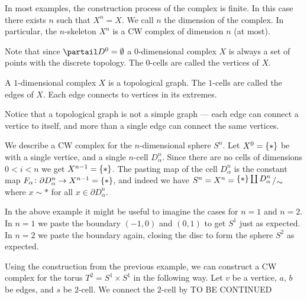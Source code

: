 \documentclass[11pt,a4paper]{article}
\begin{document}
\begin{remark}
  In most examples, the construction process of the complex is finite.
  In this case there exists $n$ such that $X^n = X$.
  We call $n$ the dimension of the complex.
  In particular, the $n$-skeleton $X^n$ is a CW complex of dimension $n$
  (at most).
\end{remark}

\begin{example}
  Note that since $\partail D^0 = \emptyset$ a $0$-dimensional complex $X$ 
  is always a set of points with the discrete topology.
  The $0$-cells are called the vertices of $X$.
\end{example}

\begin{example}
  A $1$-dimensional complex $X$ is a topological graph.
  The $1$-cells are called the edges of $X$.
  Each edge connects to vertices in its extremes.
  \begin{remark}
    Notice that a topological graph is not a simple graph --- each edge
    can connect a vertice to itself, and more than a single edge can
    connect the same vertices.
  \end{remark}
\end{example}

\begin{example}
  We describe a CW complex for the $n$-dimensional sphere $S^n$.
  Let $X^{0} = \set{*}$ be with a single vertice, and a single $n$-cell
  $D^n_{\alpha}$.
  Since there are no cells of dimensions $0 < i < n$ we get $X^{n-1} = \set{*}$.
  The pasting map of the cell $D^n_{\alpha}$ is the constant map
  $F_{\alpha} \colon \partial D^n_{\alpha} \to X^{n-1} = \set{*}$,
  and indeed we have $S^n = X^n = \bigslant{\set{*} \coprod D^n_{\alpha}}{\sim}$
  where $x \sim *$ for all $x \in \partial D^n_{\alpha}$.
\end{example}

In the above example it might be useful to imagine the cases for $n = 1$
and $n = 2$.
In $n = 1$ we paste the boundary $(-1,0)$ and $(0,1)$ to get $S^1$ just as
expected.
In $n = 2$ we paste the boundary again, closing the disc to form the sphere
$S^2$ as expected.

\begin{example}
  Using the construction from the previous example, we can construct a CW
  complex for the torus $T^2 = S^1 \times S^1$ in the following way.
  Let $v$ be a vertice, $a$, $b$ be edges, and $s$ be $2$-cell.
  We connect the $2$-cell by
  TO BE CONTINUED
\end{example}
\end{document}

